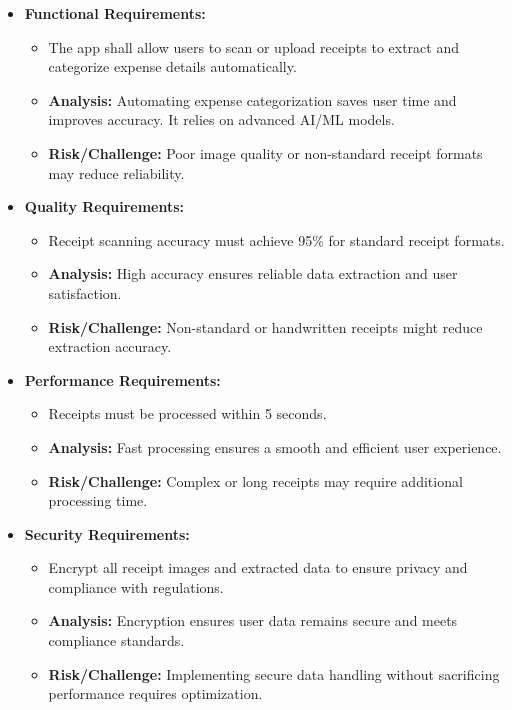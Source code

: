 \begin{itemize}
    \item \textbf{Functional Requirements:}
    \begin{itemize}
        \item The app shall allow users to scan or upload receipts to extract and categorize expense details automatically.
        \item \textbf{Analysis:} Automating expense categorization saves user time and improves accuracy. It relies on advanced AI/ML models.
        \item \textbf{Risk/Challenge:} Poor image quality or non-standard receipt formats may reduce reliability.
    \end{itemize}
    
    \item \textbf{Quality Requirements:}
    \begin{itemize}
        \item Receipt scanning accuracy must achieve 95\% for standard receipt formats.
        \item \textbf{Analysis:} High accuracy ensures reliable data extraction and user satisfaction.
        \item \textbf{Risk/Challenge:} Non-standard or handwritten receipts might reduce extraction accuracy.
    \end{itemize}
    
    \item \textbf{Performance Requirements:}
    \begin{itemize}
        \item Receipts must be processed within 5 seconds.
        \item \textbf{Analysis:} Fast processing ensures a smooth and efficient user experience.
        \item \textbf{Risk/Challenge:} Complex or long receipts may require additional processing time.
    \end{itemize}
    
    \item \textbf{Security Requirements:}
    \begin{itemize}
        \item Encrypt all receipt images and extracted data to ensure privacy and compliance with regulations.
        \item \textbf{Analysis:} Encryption ensures user data remains secure and meets compliance standards.
        \item \textbf{Risk/Challenge:} Implementing secure data handling without sacrificing performance requires optimization.
    \end{itemize}
    

\end{itemize}
